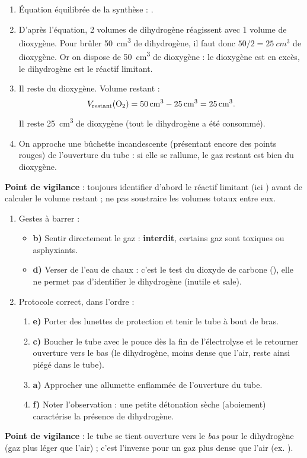 \documentclass[11pt]{article}
\begin{document}
\begin{corrige}
\begin{enumerate}
\item Équation équilibrée de la synthèse : .
\item D'après l'équation, 2 volumes de dihydrogène réagissent avec 1 volume de dioxygène. Pour brûler \SI{50}{cm^3} de dihydrogène, il faut donc $50/2 = \SI{25}{cm^3}$ de dioxygène. Or on dispose de \SI{50}{cm^3} de dioxygène : le dioxygène est en excès, le dihydrogène est le réactif limitant.
\item Il reste du dioxygène. Volume restant :
\[ V_{\text{restant}}(\ce{O2}) = \SI{50}{cm^3} - \SI{25}{cm^3} = \SI{25}{cm^3}. \]
Il reste \SI{25}{cm^3} de dioxygène (tout le dihydrogène a été consommé).
\item On approche une bûchette incandescente (présentant encore des points rouges) de l'ouverture du tube : si elle se rallume, le gaz restant est bien du dioxygène.
\end{enumerate}
\textbf{Point de vigilance} : toujours identifier d'abord le réactif limitant (ici ) avant de calculer le volume restant ; ne pas soustraire les volumes totaux entre eux.
\end{corrige}

\begin{corrige}
\begin{enumerate}
\item Gestes à barrer :
\begin{itemize}
\item \textbf{b)} Sentir directement le gaz : \textbf{interdit}, certains gaz sont toxiques ou asphyxiants.
\item \textbf{d)} Verser de l'eau de chaux : c'est le test du dioxyde de carbone (), elle ne permet pas d'identifier le dihydrogène (inutile et sale).
\end{itemize}
\item Protocole correct, dans l'ordre :
\begin{enumerate}
\item \textbf{e)} Porter des lunettes de protection et tenir le tube à bout de bras.
\item \textbf{c)} Boucher le tube avec le pouce dès la fin de l'électrolyse et le retourner ouverture vers le bas (le dihydrogène, moins dense que l'air, reste ainsi piégé dans le tube).
\item \textbf{a)} Approcher une allumette enflammée de l'ouverture du tube.
\item \textbf{f)} Noter l'observation : une petite détonation sèche (aboiement) caractérise la présence de dihydrogène.
\end{enumerate}
\end{enumerate}
\textbf{Point de vigilance} : le tube se tient ouverture vers le \emph{bas} pour le dihydrogène (gaz plus léger que l'air) ; c'est l'inverse pour un gaz plus dense que l'air (ex. ).
\end{corrige}
\end{document}
